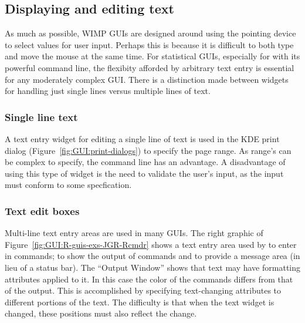 \subsection{Displaying and editing text}
\label{sec:GUI:text-widgets}

As much as possible, WIMP GUIs are designed around using the pointing
device to select values for user input. Perhaps this is because it is
difficult to both type and move the mouse at the same time. For
statistical GUIs, especially for \R\/ with its powerful command line,
the flexibity afforded by arbitrary text entry is essential for any
moderately complex GUI. There is a distinction made between widgets
for handling just single lines versus multiple lines of text.

\subsubsection{Single line text}
\label{sec:GUI:single-line-text}

A text entry widget for editing a single line of text is used in the
KDE print dialog (Figure~\ref{fig:GUI:print-dialogs}) to specify
the page range. As range's can be complex to specify, the command line
has an advantage. A disadvantage of using this type of widget is the need to
validate the user's input, as the input must conform to some specfication.

\subsubsection{Text edit boxes}
\label{sec:GUI:textboxes}

Multi-line text entry areas are used in many GUIs. The right graphic
of Figure~\ref{fig:GUI:R-guis-exs-JGR-Rcmdr} shows a text entry area
used by  to enter in \R\/ commands; to show the output of
\R\/ commands and to provide a message area (in lieu of a status
bar). The ``Output Window'' shows that text may have formatting
attributes applied to it. In this case the color of the commands
differs from that of the output. This is accomplished by specifying
text-changing attributes to different portions of the text. The
difficulty is that when the text widget is changed, these positions
must also reflect the change. 

